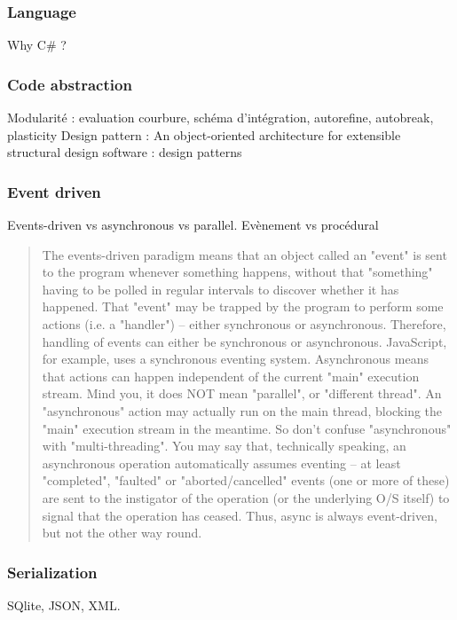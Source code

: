\subsubsection{Language}
Why C\# ? 

\subsubsection{Code abstraction}
Modularité : evaluation courbure, schéma d'intégration, autorefine, autobreak, plasticity
Design pattern
\cite{Clune2012} : An object-oriented architecture for extensible structural design software
\cite{Bishop2008} : design patterns

\subsubsection{Event driven}
Events-driven vs asynchronous vs parallel. 
Evènement vs procédural
\blockquote{The events-driven paradigm means that an object called an "event" is sent to the program whenever something happens, without that "something" having to be polled in regular intervals to discover whether it has happened. That "event" may be trapped by the program to perform some actions (i.e. a "handler") -- either synchronous or asynchronous. 
Therefore, handling of events can either be synchronous or asynchronous. JavaScript, for example, uses a synchronous eventing system.
Asynchronous means that actions can happen independent of the current "main" execution stream. Mind you, it does NOT mean "parallel", or "different thread". An "asynchronous" action may actually run on the main thread, blocking the "main" execution stream in the meantime. So don't confuse "asynchronous" with "multi-threading".
You may say that, technically speaking, an asynchronous operation automatically assumes eventing -- at least "completed", "faulted" or "aborted/cancelled" events (one or more of these) are sent to the instigator of the operation (or the underlying O/S itself) to signal that the operation has ceased. Thus, async is always event-driven, but not the other way round.
}

\subsubsection{Serialization}
SQlite, JSON, XML.

